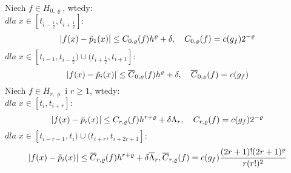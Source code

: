 \documentclass[oik, pdftex, robocza, man]{mgrwms}
\begin{document}
    \begin{lemma} \label{lem:algMP_2}
        Niech $f \in H_{0, \varrho}$, wtedy: \\
        $dla \; x \in [t_{i-\frac{1}{2}}, t_{i + \frac{1}{2}}] :$
        \begin{equation*}
            |f(x) - \tilde{p}_{1}(x)| \leq C_{0, \varrho}(f) h^{\varrho} + \delta, \quad C_{0, \varrho}(f) = c(g_{f}) 2^{-\varrho} \\
        \end{equation*}
        $dla \; x \in [t_{i-1}, t_{i - \frac{1}{2}}) \cup (t_{i + \frac{1}{2}}, t_{i+1}]  :$
        \begin{equation*}
            |f(x) - \tilde{p}_{i}(x)| \leq \overline{C} _{0, \varrho}(f) h^{\varrho}  + \delta, \quad \overline{C} _{0, \varrho}(f) = c(g_{f}) \\
        \end{equation*}
        Niech $f \in H_{r, \varrho}$ i $r \geq 1$, wtedy: \\
        $dla \; x \in [t_{i}, t_{i + r}] : $
        \begin{equation*}
            |f(x) - \tilde{p}_{i}(x)| \leq C_{r, \varrho}(f) h^{r+\varrho} + \delta\Lambda_{r}, \quad C_{r, \varrho}(f) = c(g_{f}) 2^{-\varrho} \\
        \end{equation*}
        $dla \; x \in [t_{i-r-1}, t_{i}) \cup (t_{i + r}, t_{i+2r+1}]  :$
        \begin{equation*}
            |f(x) - \tilde{p}_{i}(x)| \leq \overline{C} _{r, \varrho}(f) h^{r+\varrho} + \delta\overline{\Lambda}_{r}, \overline{C} _{r, \varrho}(f) = c(g_{f}) \frac{(2r+1)!(2r+1)^{\varrho}}{r(r!)^{2}} \\
        \end{equation*}
    \end{lemma}
\end{document}
